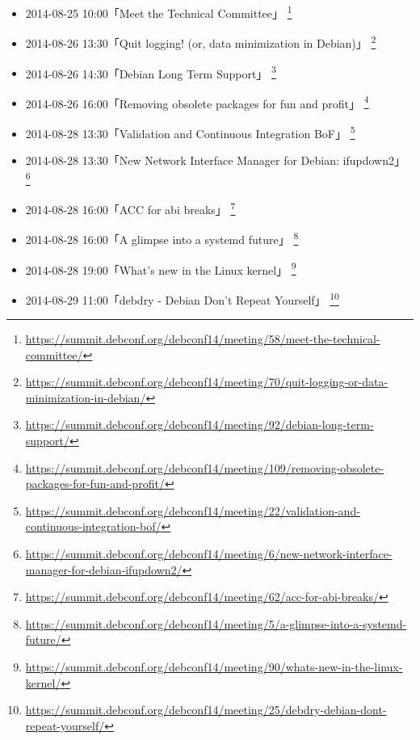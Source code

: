 \documentclass[mingoth,a4paper]{jsarticle}
\begin{document}
\begin{itemize}

\item 2014-08-25 10:00「Meet the Technical Committee」
  \footnote{\url{https://summit.debconf.org/debconf14/meeting/58/meet-the-technical-committee/}}

\item 2014-08-26 13:30「Quit logging! (or, data minimization in Debian)」
  \footnote{\url{https://summit.debconf.org/debconf14/meeting/70/quit-logging-or-data-minimization-in-debian/}}

\item 2014-08-26 14:30「Debian Long Term Support」
  \footnote{\url{https://summit.debconf.org/debconf14/meeting/92/debian-long-term-support/}}

\item 2014-08-26 16:00「Removing obsolete packages for fun and profit」
  \footnote{\url{https://summit.debconf.org/debconf14/meeting/109/removing-obsolete-packages-for-fun-and-profit/}}

\item 2014-08-28 13:30「Validation and Continuous Integration BoF」
  \footnote{\url{https://summit.debconf.org/debconf14/meeting/22/validation-and-continuous-integration-bof/}}

\item 2014-08-28 13:30「New Network Interface Manager for Debian: ifupdown2」
  \footnote{\url{https://summit.debconf.org/debconf14/meeting/6/new-network-interface-manager-for-debian-ifupdown2/}}

\item 2014-08-28 16:00「ACC for abi breaks」
  \footnote{\url{https://summit.debconf.org/debconf14/meeting/62/acc-for-abi-breaks/}}

\item 2014-08-28 16:00「A glimpse into a systemd future」
  \footnote{\url{https://summit.debconf.org/debconf14/meeting/5/a-glimpse-into-a-systemd-future/}}

\item 2014-08-28 19:00「What's new in the Linux kernel」
  \footnote{\url{https://summit.debconf.org/debconf14/meeting/90/whats-new-in-the-linux-kernel/}}

\item 2014-08-29 11:00「debdry - Debian Don't Repeat Yourself」
  \footnote{\url{https://summit.debconf.org/debconf14/meeting/25/debdry-debian-dont-repeat-yourself/}}

\end{itemize}
\end{document}
